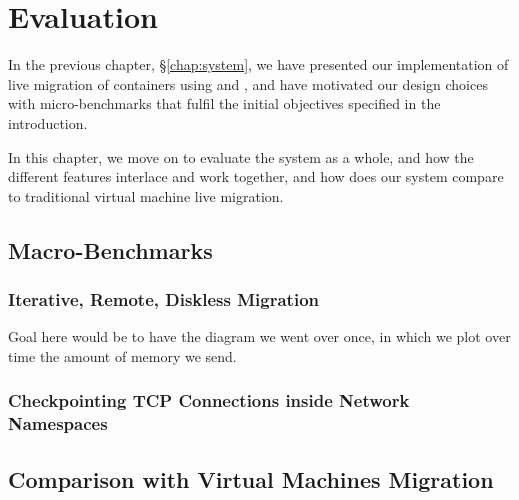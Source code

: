 \chapter{Evaluation} \label{chap:evaluation}

In the previous chapter, \S\ref{chap:system}, we have presented our implementation of live migration of containers using \criu and \runc, and have motivated our design choices with micro-benchmarks that fulfil the initial objectives specified in the introduction.

In this chapter, we move on to evaluate the system as a whole, and how the different features interlace and work together, and  how does our system compare to traditional virtual machine live migration.

\section{Macro-Benchmarks}

\subsection{Iterative, Remote, Diskless Migration}

Goal here would be to have the diagram we went over once, in which we plot over time the amount of memory we send.


\subsection{Checkpointing TCP Connections inside Network Namespaces}


\section{Comparison with Virtual Machines Migration}

